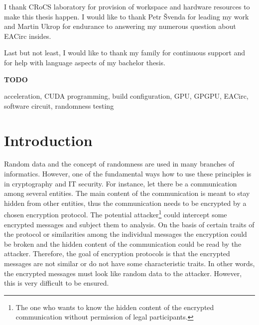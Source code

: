 \documentclass[12pt,oneside]{fithesis2}
\newcommand{\todo}{
	\noindent
	{\large\color{red}\textbf{TODO}}
}
\begin{document}
\FrontMatter
	\ThesisTitlePage
	\begin{ThesisDeclaration}
		\DeclarationText
		\AdvisorName
	\end{ThesisDeclaration}
	\begin{ThesisThanks}
		I thank CRoCS laboratory for provision of workspace and hardware resources to make this thesis happen. I would like to thank Petr Švenda for leading my work and Martin Ukrop for endurance to answering my numerous question about EACirc insides.
		
		\bigskip
		
		\noindent
		Last but not least, I would like to thank my family for continuous support and for help with language aspects of my bachelor thesis.
	\end{ThesisThanks}
	\begin{ThesisAbstract}
		\todo{}
	\end{ThesisAbstract}
	\begin{ThesisKeyWords}
		acceleration, CUDA programming, build configuration, GPU, GPGPU, EACirc, software circuit, randomness testing
	\end{ThesisKeyWords}
	\tableofcontents

\MainMatter
\chapter{Introduction}
Random data and the concept of randomness are used in many branches of informatics. However, one of the fundamental ways how to use these principles is in cryptography and IT security. For instance, let there be a communication among several entities. The main content of the communication is meant to stay hidden from other entities, thus the communication needs to be encrypted by a chosen encryption protocol. The potential attacker\footnote{The one who wants to know the hidden content of the encrypted communication without permission of legal participants.} could intercept some encrypted messages and subject them to analysis. On the basis of certain traits of the protocol or similarities among the individual messages the encryption could be broken and the hidden content of the communication could be read by the attacker. Therefore, the goal of encryption protocols is that the encrypted messages are not similar or do not have some characteristic traits. In other words, the encrypted messages must look like random data to the attacker. However, this is very difficult to be ensured.
\end{document}
